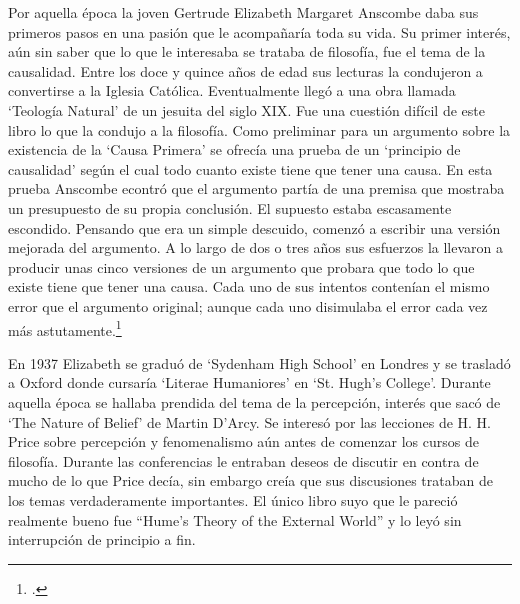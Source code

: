 Por aquella época la joven Gertrude Elizabeth Margaret Anscombe daba sus
primeros pasos en una pasión que le acompañaría toda su vida. Su primer interés,
aún sin saber que lo que le interesaba se trataba de filosofía, fue el tema de la
causalidad.
Entre los doce y quince años de edad sus lecturas la condujeron a convertirse a
la Iglesia Católica. Eventualmente llegó a una obra llamada `Teología Natural'
de un jesuita del siglo XIX.
Fue una cuestión difícil de este libro lo que la condujo a la filosofía. 
Como preliminar para un argumento sobre la existencia de la `Causa Primera' se
ofrecía una prueba de un `principio de causalidad' según el cual todo cuanto
existe tiene que tener una causa. En esta prueba Anscombe econtró que el argumento
partía de una premisa que mostraba un presupuesto de su propia conclusión. El
supuesto estaba escasamente escondido. Pensando que era un simple descuido,
comenzó a escribir una versión mejorada del argumento. 
A lo largo de dos o tres años sus esfuerzos la llevaron a producir unas cinco
versiones de un argumento que probara que todo lo que existe tiene que tener una
causa. Cada uno de sus intentos contenían el mismo error que el argumento
original; aunque cada uno disimulaba el error cada vez más astutamente.\footcite[cf.~][p.~vii]{M&PotM}

En 1937 Elizabeth se graduó de `Sydenham High School' en Londres y se trasladó a
Oxford donde cursaría `Literae Humaniores' en `St. Hugh's College'. Durante
aquella época se hallaba prendida del tema de la percepción, interés que sacó de
`The Nature of Belief' de Martin D'Arcy. Se interesó por las lecciones de H. H. Price
sobre percepción y fenomenalismo aún antes de comenzar los cursos de filosofía.
Durante las conferencias le entraban deseos de discutir en contra de mucho de lo
que Price decía, sin embargo creía que sus discusiones trataban de los temas
verdaderamente importantes. El único libro suyo que le pareció realmente bueno
fue ``Hume's Theory of the External World'' y lo leyó sin interrupción de
principio a fin.





